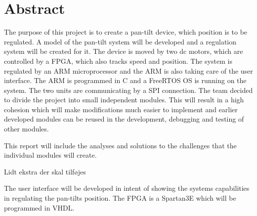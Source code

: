 \chapter*{Abstract}

The purpose of this project is to create a pan-tilt device, which position is to be regulated. A model of the pan-tilt system will be developed and a regulation system will be created for it. The device is moved by two dc motors, which are controlled by a FPGA, which also tracks speed and position. The system is regulated by an ARM microprocessor and the ARM is also taking care of the user interface. The ARM is programmed in C and a FreeRTOS OS is running on the system. The two units are communicating by a SPI connection. The team decided to divide the project into small independent modules. This will result in a high cohesion which will make modifications much easier to implement and earlier developed modules can be reused in the development, debugging and testing of other modules.

This report will include the analyses and solutions to the challenges that the individual modules will create.

Lidt ekstra der skal tilføjes

The user interface will be developed in intent of showing the systems capabilities in regulating the pan-tilts position.
The FPGA is a Spartan3E which will be programmed in VHDL. 